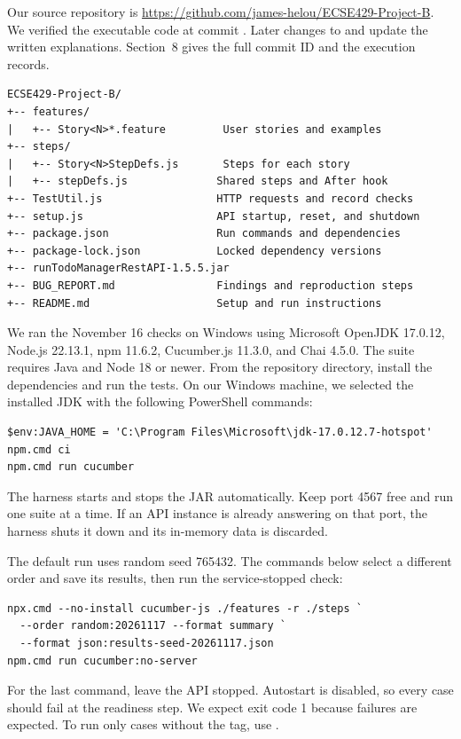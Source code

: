 Our source repository is
\url{https://github.com/james-helou/ECSE429-Project-B}.
We verified the executable code at commit . Later changes to
 and  update the written explanations.
Section~8 gives the full commit ID and the execution records.

\begin{lstlisting}
ECSE429-Project-B/
+-- features/
|   +-- Story<N>*.feature         User stories and examples
+-- steps/
|   +-- Story<N>StepDefs.js       Steps for each story
|   +-- stepDefs.js              Shared steps and After hook
+-- TestUtil.js                  HTTP requests and record checks
+-- setup.js                     API startup, reset, and shutdown
+-- package.json                 Run commands and dependencies
+-- package-lock.json            Locked dependency versions
+-- runTodoManagerRestAPI-1.5.5.jar
+-- BUG_REPORT.md                Findings and reproduction steps
+-- README.md                    Setup and run instructions
\end{lstlisting}

We ran the November 16 checks on Windows using Microsoft OpenJDK 17.0.12,
Node.js 22.13.1, npm 11.6.2, Cucumber.js 11.3.0, and Chai 4.5.0.
The suite requires Java and Node 18 or newer. From the repository directory,
install the dependencies and run the tests. On our Windows machine, we selected
the installed JDK with the following PowerShell commands:
\begin{lstlisting}
$env:JAVA_HOME = 'C:\Program Files\Microsoft\jdk-17.0.12.7-hotspot'
npm.cmd ci
npm.cmd run cucumber
\end{lstlisting}
The harness starts and stops the JAR automatically. Keep port 4567 free and run
one suite at a time. If an API instance is already answering on that port, the
harness shuts it down and its in-memory data is discarded.

The default run uses random seed 765432. The commands below select a different
order and save its results, then run the service-stopped check:
\begin{lstlisting}
npx.cmd --no-install cucumber-js ./features -r ./steps `
  --order random:20261117 --format summary `
  --format json:results-seed-20261117.json
npm.cmd run cucumber:no-server
\end{lstlisting}
For the last command, leave the API stopped. Autostart is disabled, so every case
should fail at the readiness step. We expect exit code 1 because failures are
expected. To run only cases without the
 tag, use .
